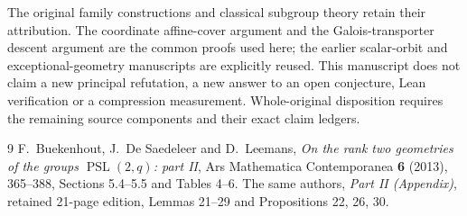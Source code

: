 \documentclass[11pt]{article}
\newcommand{\PSL}{\operatorname{PSL}}\newcommand{\PGL}{\operatorname{PGL}}
\begin{document}
The original family constructions and classical subgroup theory retain
their attribution. The coordinate affine-cover argument and the
Galois-transporter descent argument are the common proofs used here;
the earlier scalar-orbit and exceptional-geometry manuscripts are
explicitly reused. This manuscript does not claim a new principal
refutation, a new answer to an open conjecture, Lean verification or
a compression measurement. Whole-original disposition requires the
remaining source components and their exact claim ledgers.

\begin{thebibliography}{9}
 F.~Buekenhout, J.~De Saedeleer and D.~Leemans,
\emph{On the rank two geometries of the groups $\PSL(2,q)$: part II},
Ars Mathematica Contemporanea \textbf{6} (2013), 365--388,
Sections 5.4--5.5 and Tables 4--6.
 The same authors, \emph{Part II (Appendix)},
retained 21-page edition, Lemmas 21--29 and Propositions 22, 26, 30.
\end{thebibliography}
\end{document}
